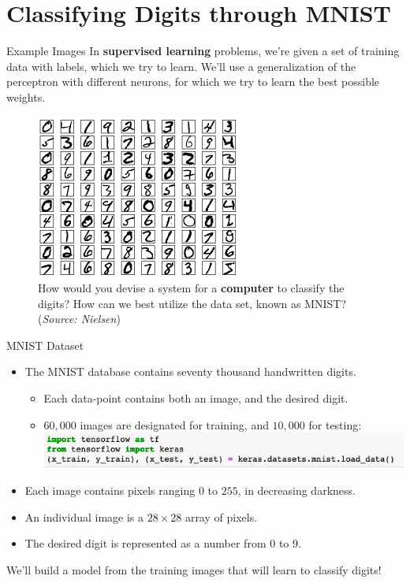 \documentclass[xcolor=dvipsnames, fontsize=11pt, %
pagesize, %
parskip=half-, t]{beamer}
\begin{document}
\section{Classifying Digits through MNIST}
\begin{frame}[c]{Example Images}
In \textbf{supervised learning} problems, we're given a set of training data with labels, which we try to learn. We'll use a generalization of the perceptron with different neurons, for which we try to learn the best possible weights.  
\begin{figure} 
\center
\includegraphics{mnist_100_digits.png}
\caption{How would you devise a system for a \textbf{computer} to classify the digits? How can we best utilize the data set, known as MNIST?  (\textit{Source: Nielsen}) }
\end{figure}
\end{frame}

\begin{frame}[c]{MNIST Dataset}
\begin{itemize}
\item The MNIST database contains seventy thousand handwritten digits.   
\begin{itemize}
\item Each data-point contains both an image, and the desired digit.
\item $60,000$ images are designated for training, and $10,000$ for testing:
\includegraphics[scale=0.42]{load.png}
\end{itemize}  
\item Each image contains pixels ranging $0$ to $255$, in decreasing darkness. 
\item  An individual image is a $28\times 28$ array of pixels.  
\item The desired digit is represented as a number from $0$ to $9$.  
\end{itemize}
We'll build a model from the training images that will learn to classify digits!
\end{frame}
\end{document}
